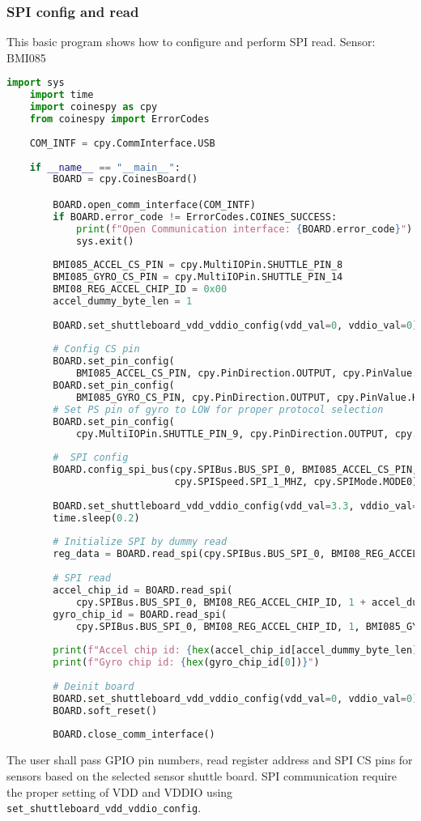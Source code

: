 \documentclass{article}
\begin{document}
\subsubsection{SPI config and read}
This basic program shows how to configure and perform SPI read.
\newline Sensor: BMI085
\begin{lstlisting}[language=python]
	import sys
	import time
	import coinespy as cpy
	from coinespy import ErrorCodes
	
	COM_INTF = cpy.CommInterface.USB
	
	if __name__ == "__main__":
		BOARD = cpy.CoinesBoard()

		BOARD.open_comm_interface(COM_INTF)
		if BOARD.error_code != ErrorCodes.COINES_SUCCESS:
			print(f"Open Communication interface: {BOARD.error_code}")
			sys.exit()
	
		BMI085_ACCEL_CS_PIN = cpy.MultiIOPin.SHUTTLE_PIN_8
		BMI085_GYRO_CS_PIN = cpy.MultiIOPin.SHUTTLE_PIN_14
		BMI08_REG_ACCEL_CHIP_ID = 0x00
		accel_dummy_byte_len = 1
	
		BOARD.set_shuttleboard_vdd_vddio_config(vdd_val=0, vddio_val=0)
	
		# Config CS pin
		BOARD.set_pin_config(
			BMI085_ACCEL_CS_PIN, cpy.PinDirection.OUTPUT, cpy.PinValue.HIGH)
		BOARD.set_pin_config(
			BMI085_GYRO_CS_PIN, cpy.PinDirection.OUTPUT, cpy.PinValue.HIGH)
		# Set PS pin of gyro to LOW for proper protocol selection
		BOARD.set_pin_config(
			cpy.MultiIOPin.SHUTTLE_PIN_9, cpy.PinDirection.OUTPUT, cpy.PinValue.LOW)
	
		#  SPI config
		BOARD.config_spi_bus(cpy.SPIBus.BUS_SPI_0, BMI085_ACCEL_CS_PIN,
							 cpy.SPISpeed.SPI_1_MHZ, cpy.SPIMode.MODE0)
	
		BOARD.set_shuttleboard_vdd_vddio_config(vdd_val=3.3, vddio_val=3.3)
		time.sleep(0.2)
	
		# Initialize SPI by dummy read
		reg_data = BOARD.read_spi(cpy.SPIBus.BUS_SPI_0, BMI08_REG_ACCEL_CHIP_ID, 1)
	
		# SPI read
		accel_chip_id = BOARD.read_spi(
			cpy.SPIBus.BUS_SPI_0, BMI08_REG_ACCEL_CHIP_ID, 1 + accel_dummy_byte_len, BMI085_ACCEL_CS_PIN)
		gyro_chip_id = BOARD.read_spi(
			cpy.SPIBus.BUS_SPI_0, BMI08_REG_ACCEL_CHIP_ID, 1, BMI085_GYRO_CS_PIN)
	
		print(f"Accel chip id: {hex(accel_chip_id[accel_dummy_byte_len])}")
		print(f"Gyro chip id: {hex(gyro_chip_id[0])}")
	
		# Deinit board
		BOARD.set_shuttleboard_vdd_vddio_config(vdd_val=0, vddio_val=0)
		BOARD.soft_reset()
	
		BOARD.close_comm_interface()
\end{lstlisting}
The user shall pass GPIO pin numbers, read register address and SPI CS pins for sensors based on the selected sensor shuttle board. SPI communication require the proper setting of VDD and VDDIO using \texttt{set\_shuttleboard\_vdd\_vddio\_config}.

\newpage
\end{document}
